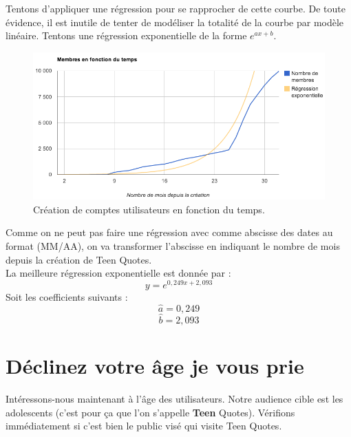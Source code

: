 \documentclass{report}
\begin{document}
	Tentons d'appliquer une régression pour se rapprocher de cette courbe. De toute évidence, il est inutile de tenter de modéliser la totalité de la courbe par modèle linéaire. Tentons une régression exponentielle de la forme $e^{ax + b}$.
	\begin{figure}[H]
		\center
		\includegraphics[width=450px]{images/membresRegression.png}
		\caption{Création de comptes utilisateurs en fonction du temps.}
	\end{figure}
	Comme on ne peut pas faire une régression avec comme abscisse des dates au format (MM/AA), on va transformer l'abscisse en indiquant le nombre de mois depuis la création de Teen Quotes.\\
	La meilleure régression exponentielle est donnée par :
	\[y = e^{0,249x + 2,093}\]
	Soit les coefficients suivants :
	\[\widehat{a} = 0,249\]
	\[\widehat{b} = 2,093\]

	\section{Déclinez votre âge je vous prie}
	Intéressons-nous maintenant à l'âge des utilisateurs. Notre audience cible est les adolescents (c'est pour ça que l'on s'appelle \textbf{Teen} Quotes). Vérifions immédiatement si c'est bien le public visé qui visite Teen Quotes.\\
\end{document}
